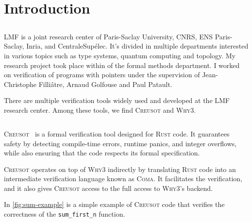 \documentclass[11pt,a4paper]{article}
\begin{document}


\tableofcontents

\newpage
{} 


\newcommand{\rust}{\textsc{Rust}}
\newcommand{\creusot}{\textsc{Creusot}}
\newcommand{\why}{\textsc{Why3}}

\section{Introduction}

\subsection{}
 LMF is a joint research center of Paris-Saclay University, CNRS, ENS Paris-Saclay, Inria, and CentraleSupélec. It's divided in multiple departments interested in various topics such as type systems, quantum computing and topology. My research project took place within  of the formal methods department. I worked on verification of programs with pointers under the supervision of Jean-Christophe Filliâtre, Arnaud Golfouse and Paul Patault.

There are multiple verification tools widely used and developed at the LMF research center. Among these tools, we find \creusot{} and \why{}.

\subsection{\scol{\creusot{} tool}}
\subsubsection{}
\creusot{}~\cite{jh} is a formal verification tool designed for \rust{} code. It guarantees safety by detecting compile-time errors, runtime panics, and integer overflows, while also ensuring that the code respects its formal specification.

\creusot{} operates on top of \why{} indirectly by translating \rust{} code into an intermediate verification language known as \textsc{Coma}. It facilitates the verification, and it also gives \creusot{} access to the full access to \why{}'s backend.

In \autoref{fig:sum-example} is a simple example of \creusot{} code that verifies the correctness of the \texttt{sum\_first\_n} function.
\end{document}
